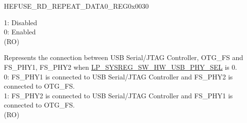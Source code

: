 \begin{register}{H}{EFUSE\_RD\_REPEAT\_DATA0\_REG}{0x0030}
\begin{regdesc}
\begin{reglist}
1: Disabled\\
0: Enabled\\
(RO)
\label{fielddesc:EFUSEUSBPHYSEL}\item [EFUSE\_USB\_PHY\_SEL] Represents the connection between USB Serial/JTAG Controller, OTG\_FS and FS\_PHY1, FS\_PHY2 when \hyperref[fielddesc:LPSYSREGSWHWUSBPHYSEL]{LP\_SYSREG\_SW\_HW\_USB\_PHY\_SEL} is 0.\\
0: FS\_PHY1 is connected to USB Serial/JTAG Controller and FS\_PHY2 is connected to OTG\_FS.\\
1: FS\_PHY2 is connected to USB Serial/JTAG Controller and FS\_PHY1 is connected to OTG\_FS.\\
(RO)
\end{reglist}\end{regdesc}
\end{register}


